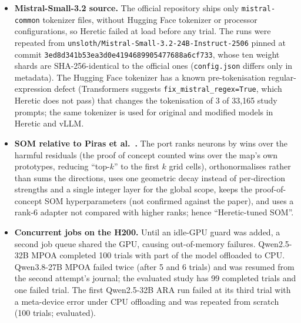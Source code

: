 \begin{itemize}
\item \textbf{Mistral-Small-3.2 source.} The official repository ships only
  \texttt{mistral-common} tokenizer files, without Hugging Face tokenizer or
  processor configurations, so Heretic failed at load before any trial. The runs
  were repeated from \texttt{unsloth/Mistral-Small-3.2-24B-Instruct-2506} pinned
  at commit \texttt{3ed8d341b53ea3d0e4194689905477688a6cf733}, whose ten weight
  shards are SHA-256-identical to the official ones (\texttt{config.json}
  differs only in metadata). The Hugging Face tokenizer has a known
  pre-tokenisation regular-expression defect (Transformers suggests
  \texttt{fix\_mistral\_regex=True}, which Heretic does not pass) that changes
  the tokenisation of 3 of 33{,}165 study prompts; the same tokenizer is used
  for original and modified models in Heretic and vLLM.
\item \textbf{SOM relative to Piras et al.~\cite{piras2025som}.} The port ranks neurons by
  wins over the harmful residuals (the proof of concept counted wins over the
  map's own prototypes, reducing ``top-$k$'' to the first $k$ grid cells),
  orthonormalises rather than sums the directions, uses one geometric decay
  instead of per-direction strengths and a single integer layer for the global
  scope, keeps the proof-of-concept SOM hyperparameters (not confirmed against
  the paper), and uses a rank-6 adapter not compared with higher ranks; hence
  ``Heretic-tuned SOM''.
\item \textbf{Concurrent jobs on the H200.} Until an idle-GPU guard was added, a
  second job queue shared the GPU, causing out-of-memory failures. Qwen2.5-32B
  MPOA completed 100 trials with part of the model offloaded to CPU. Qwen3.8-27B
  MPOA failed twice (after 5 and 6 trials) and was resumed from the second
  attempt's journal; the evaluated study has 99 completed trials and one failed
  trial. The first Qwen2.5-32B ARA run failed at its third trial with a
  meta-device error under CPU offloading and was repeated from scratch (100
  trials; evaluated).

\end{itemize}

